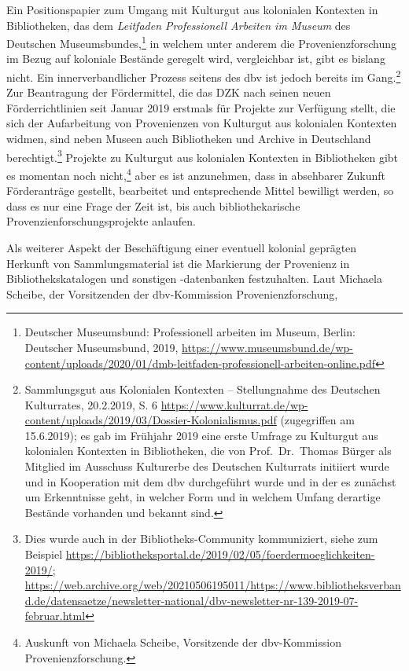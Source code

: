 \documentclass[a4paper,
fontsize=11pt,
oneside,
numbers=noperiodatend,
parskip=half-,
bibliography=totoc,
final
]{scrartcl}
\begin{document}
Ein Positionspapier zum Umgang mit Kulturgut aus kolonialen Kontexten in
Bibliotheken, das dem \emph{Leitfaden Professionell Arbeiten im Museum}
des Deutschen Museumsbundes,\footnote{Deutscher Museumsbund:
  Professionell arbeiten im Museum, Berlin: Deutscher Museumsbund, 2019,
  \url{https://www.museumsbund.de/wp-content/uploads/2020/01/dmb-leitfaden-professionell-arbeiten-online.pdf}}
in welchem unter anderem die Provenienzforschung im Bezug auf koloniale
Bestände geregelt wird, vergleichbar ist, gibt es bislang nicht. Ein
innerverbandlicher Prozess seitens des dbv ist jedoch bereits im
Gang.\footnote{Sammlungsgut aus Kolonialen Kontexten -- Stellungnahme
  des Deutschen Kulturrates, 20.2.2019, S. 6
  \url{https://www.kulturrat.de/wp-content/uploads/2019/03/Dossier-Kolonialismus.pdf}
  (zugegriffen am 15.6.2019); es gab im Frühjahr 2019 eine erste Umfrage
  zu Kulturgut aus kolonialen Kontexten in Bibliotheken, die von
  Prof.~Dr.~Thomas Bürger als Mitglied im Ausschuss Kulturerbe des
  Deutschen Kulturrats initiiert wurde und in Kooperation mit dem dbv
  durchgeführt wurde und in der es zunächst um Erkenntnisse geht, in
  welcher Form und in welchem Umfang derartige Bestände vorhanden und
  bekannt sind.} Zur Beantragung der Fördermittel, die das DZK nach
seinen neuen Förderrichtlinien seit Januar 2019 erstmals für Projekte
zur Verfügung stellt, die sich der Aufarbeitung von Provenienzen von
Kulturgut aus kolonialen Kontexten widmen, sind neben Museen auch
Bibliotheken und Archive in Deutschland berechtigt.\footnote{Dies wurde
  auch in der Bibliotheks-Community kommuniziert, siehe zum Beispiel
  \url{https://bibliotheksportal.de/2019/02/05/foerdermoeglichkeiten-2019/};
  \url{https://web.archive.org/web/20210506195011/https://www.bibliotheksverband.de/datensaetze/newsletter-national/dbv-newsletter-nr-139-2019-07-februar.html}}
Projekte zu Kulturgut aus kolonialen Kontexten in Bibliotheken gibt es
momentan noch nicht,\footnote{Auskunft von Michaela Scheibe, Vorsitzende
  der dbv-Kommission Provenienzforschung.} aber es ist anzunehmen, dass
in absehbarer Zukunft Förderanträge gestellt, bearbeitet und
entsprechende Mittel bewilligt werden, so dass es nur eine Frage der
Zeit ist, bis auch bibliothekarische Provenzienforschungsprojekte
anlaufen.

Als weiterer Aspekt der Beschäftigung einer eventuell kolonial geprägten
Herkunft von Sammlungsmaterial ist die Markierung der Provenienz in
Bibliothekskatalogen und sonstigen -daten\-banken festzuhalten. Laut
Michaela Scheibe, der Vorsitzenden der dbv-Kommission
Provenienzforschung,
\end{document}
